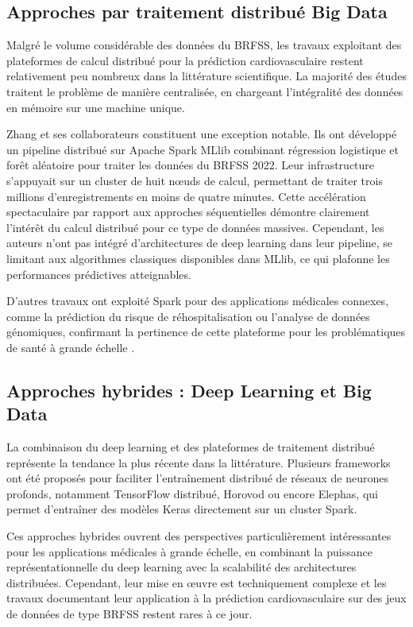 \documentclass[12pt,a4paper]{report}
\begin{document}
\subsection{Approches par traitement distribué Big Data}

Malgré le volume considérable des données du \acs{BRFSS}, les travaux exploitant des
plateformes de calcul distribué pour la prédiction cardiovasculaire restent
relativement peu nombreux dans la littérature scientifique. La majorité des études
traitent le problème de manière centralisée, en chargeant l'intégralité des données
en mémoire sur une machine unique.

Zhang et ses collaborateurs \cite{zhang2023} constituent une exception notable. Ils
ont développé un pipeline distribué sur Apache Spark MLlib combinant régression
logistique et forêt aléatoire pour traiter les données du \acs{BRFSS} 2022. Leur
infrastructure s'appuyait sur un cluster de huit nœuds de calcul, permettant de
traiter trois millions d'enregistrements en moins de quatre minutes. Cette
accélération spectaculaire par rapport aux approches séquentielles démontre clairement
l'intérêt du calcul distribué pour ce type de données massives. Cependant, les auteurs
n'ont pas intégré d'architectures de deep learning dans leur pipeline, se limitant aux
algorithmes classiques disponibles dans MLlib, ce qui plafonne les performances
prédictives atteignables.

D'autres travaux ont exploité Spark pour des applications médicales connexes, comme
la prédiction du risque de réhospitalisation ou l'analyse de données génomiques,
confirmant la pertinence de cette plateforme pour les problématiques de santé à
grande échelle \cite{meng2016}.

\subsection{Approches hybrides : Deep Learning et Big Data}

La combinaison du deep learning et des plateformes de traitement distribué représente
la tendance la plus récente dans la littérature. Plusieurs frameworks ont été proposés
pour faciliter l'entraînement distribué de réseaux de neurones profonds, notamment
TensorFlow distribué, Horovod ou encore Elephas, qui permet d'entraîner des modèles
Keras directement sur un cluster Spark.

Ces approches hybrides ouvrent des perspectives particulièrement intéressantes pour
les applications médicales à grande échelle, en combinant la puissance
représentationnelle du deep learning avec la scalabilité des architectures
distribuées. Cependant, leur mise en œuvre est techniquement complexe et les travaux
documentant leur application à la prédiction cardiovasculaire sur des jeux de données
de type \acs{BRFSS} restent rares à ce jour.
\end{document}
